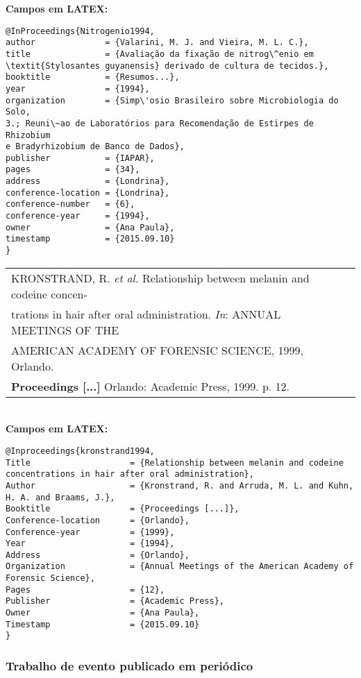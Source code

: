\textbf{Campos em LATEX:} 


\begin{verbatim}
@InProceedings{Nitrogenio1994,
author              = {Valarini, M. J. and Vieira, M. L. C.},
title               = {Avaliação da fixação de nitrog\^enio em 
\textit{Stylosantes guyanensis} derivado de cultura de tecidos.},
booktitle           = {Resumos...},
year                = {1994},
organization        = {Simp\'osio Brasileiro sobre Microbiologia do Solo, 
3.; Reuni\~ao de Laboratórios para Recomendação de Estirpes de Rhizobium 
e Bradyrhizobium de Banco de Dados},
publisher           = {IAPAR},
pages               = {34},
address             = {Londrina},
conference-location = {Londrina},
conference-number   = {6},
conference-year     = {1994},
owner               = {Ana Paula},
timestamp           = {2015.09.10}
}
\end{verbatim}

\begin{tabular}{|l|c|} \hline
	KRONSTRAND, R. \textit{et al.} Relationship between melanin and codeine
	concen-\\trations in hair after oral administration. \textit{In}: ANNUAL MEETINGS OF THE \\AMERICAN  ACADEMY OF FORENSIC SCIENCE, 1999, Orlando. \\\textbf{Proceedings [...]} Orlando:  Academic Press, 1999. p. 12.   \\\hline
\end{tabular} \\

\textbf{Campos em LATEX:} 

\begin{verbatim}
@Inproceedings{kronstrand1994,
Title                    = {Relationship between melanin and codeine
concentrations in hair after oral administration},
Author                   = {Kronstrand, R. and Arruda, M. L. and Kuhn, 
H. A. and Braams, J.},
Booktitle                = {Proceedings [...]},
Conference-location      = {Orlando},
Conference-year          = {1999},
Year                     = {1994},
Address                  = {Orlando},
Organization             = {Annual Meetings of the American Academy of 
Forensic Science},
Pages                    = {12},
Publisher                = {Academic Press},
Owner                    = {Ana Paula},
Timestamp                = {2015.09.10}
}
\end{verbatim}

\subsubsection{Trabalho de evento publicado em periódico} 

